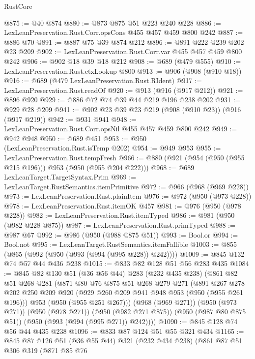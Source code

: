 \begin{lexlean}{RustCore}
\begin{coremodule}
@875 := @40 @874
@880 := @873 @875 @51 @223 @240 @228
@886 := LexLeanPreservation.Rust.Corr.opsCons @455 @457 @459 @800 @242
@887 := @886 @70
@891 := @887 @75 @39 @874 @212
@896 := @891 @222 @239 @202 @23 @209
@902 := LexLeanPreservation.Rust.Corr.var @455 @457 @459 @800 @242
@906 := @902 @18 @39 @18 @212
@908 := @689 (@479 @555)
@910 := LexLeanPreservation.Rust.ctxLookup @800
@913 := @906 (@908 (@910 @18))
@916 := @689 (@479 LexLeanPreservation.Rust.RIdent)
@917 := LexLeanPreservation.Rust.readOf
@920 := @913 (@916 (@917 @212))
@921 := @896 @920
@929 := @886 @72 @74 @39 @44 @219 @196 @238 @202
@931 := @929 @28 @209
@941 := @902 @23 @39 @23 @219 (@908 (@910 @23)) (@916 (@917 @219))
@942 := @931 @941
@948 := LexLeanPreservation.Rust.Corr.opsNil @455 @457 @459 @800 @242
@949 := @942 @948
@950 := @689 @451
@953 := @950 (LexLeanPreservation.Rust.isTemp @202)
@954 := @949 @953
@955 := LexLeanPreservation.Rust.tempFresh
@966 := @880 (@921 (@954 (@950 (@955 @215 @196))) @953 (@950 (@955 @204 @222)))
@968 := @689 LexLeanTarget.TargetSyntax.Prim
@969 := LexLeanTarget.RustSemantics.itemPrimitive
@972 := @966 (@968 (@969 @228))
@973 := LexLeanPreservation.Rust.plainItem
@976 := @972 (@950 (@973 @228))
@978 := LexLeanPreservation.Rust.itemOK @457
@981 := @976 (@950 (@978 @228))
@982 := LexLeanPreservation.Rust.itemTyped
@986 := @981 (@950 (@982 @228 @875))
@987 := LexLeanPreservation.Rust.primTyped
@988 := @987 @67
@992 := @986 (@950 (@988 @875 @51))
@993 := Bool.or
@994 := Bool.not
@995 := LexLeanTarget.RustSemantics.itemFallible
@1003 := @855 (@865 (@992 (@950 (@993 (@994 (@995 @228)) @242))))
@1009 := @845 @132 @74 @57 @44 @436 @238
@1015 := @833 @82 @128 @51 @56 @283 @435
@1084 := @845
    @82
    @130
    @51
    (@36 @56 @44)
    @283
    (@232 @435 @238)
    (@861
      @82
      @51
      @268
      @281
      (@871
        @80
        @76
        @875
        @51
        @268
        @279
        @271
        (@891
          @267
          @278
          @202
          @250
          @209
          @920
          (@929 @260 @209 @941 @948 @953 (@950 (@955 @261 @196)))
          @953
          (@950 (@955 @251 @267)))
        (@968 (@969 @271))
        (@950 (@973 @271))
        (@950 (@978 @271))
        (@950 (@982 @271 @875))
        (@950 (@987 @80 @875 @51))
        (@950 (@993 (@994 (@995 @271)) @242))))
@1090 := @845 @128 @74 @56 @44 @435 @238
@1096 := @833 @87 @124 @51 @55 @321 @434
@1165 := @845
    @87
    @126
    @51
    (@36 @55 @44)
    @321
    (@232 @434 @238)
    (@861
      @87
      @51
      @306
      @319
      (@871
        @85
        @76

\end{coremodule}
\end{lexlean}
